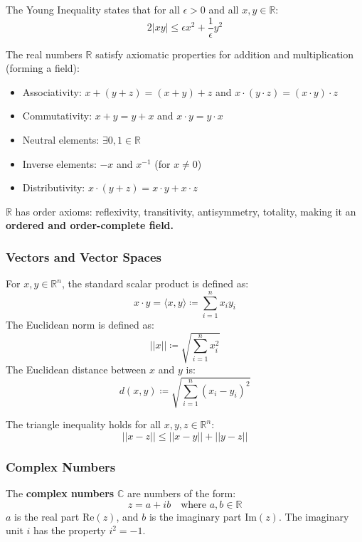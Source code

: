 \begin{theorem}
The Young Inequality states that for all $\epsilon \gt 0$ and all $x, y \in \mathbb{R}$:
$$2\lvert xy \rvert \leq \epsilon x^2 + \frac{1}{\epsilon} y^2$$
\end{theorem}

\begin{theorem}
The real numbers $\mathbb{R}$ satisfy axiomatic properties for addition and multiplication (forming a field):
\begin{itemize}
    \item Associativity: $x + (y + z) = (x + y) + z$ and $x \cdot (y \cdot z) = (x \cdot y) \cdot z$
    \item Commutativity: $x + y = y + x$ and $x \cdot y = y \cdot x$
    \item Neutral elements: $\exists 0, 1 \in \mathbb{R}$
    \item Inverse elements: $-x$ and $x^{-1}$ (for $x \neq 0$)
    \item Distributivity: $x \cdot (y + z) = x \cdot y + x \cdot z$
\end{itemize}
$\mathbb{R}$ has order axioms: reflexivity, transitivity, antisymmetry, totality, making it an \textbf{ordered and order-complete field.}
\end{theorem}

\subsubsection{Vectors and Vector Spaces}

\begin{definition}
For $x, y \in \mathbb{R}^n$, the standard scalar product is defined as:
$$x \cdot y = \langle x, y \rangle \coloneqq \sum_{i=1}^n x_i y_i$$
The Euclidean norm is defined as:
$$||x|| \coloneqq \sqrt{\sum_{i=1}^n x_i^2}$$
The Euclidean distance between $x$ and $y$ is:
$$d(x, y) \coloneqq \sqrt{\sum_{i=1}^n (x_i - y_i)^2}$$
\end{definition}

\begin{theorem}
The triangle inequality holds for all $x, y, z \in \mathbb{R}^n$:
$$||x - z|| \leq ||x - y|| + ||y - z||$$
\end{theorem}

\subsubsection{Complex Numbers}

\begin{definition}
The \textbf{complex numbers} $\mathbb{C}$ are numbers of the form:
$$z = a + ib \quad \text{where } a, b \in \mathbb{R}$$
$a$ is the real part $\text{Re}(z)$, and $b$ is the imaginary part $\text{Im}(z)$. The imaginary unit $i$ has the property $i^2 = -1$.
\end{definition}

